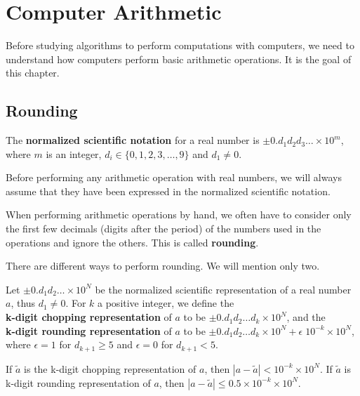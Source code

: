 \chapter{Computer Arithmetic}\label{chaptArith}

Before studying algorithms to perform computations with computers, we
need to understand how computers perform basic arithmetic operations.
It is the goal of this chapter.

\section{Rounding}

\begin{defn}
The {\bfseries normalized scientific notation} for a real number is
$\pm 0.d_1d_2d_3\ldots \times 10^m$, where $m$ is an
integer, $d_i \in \{0,1,2,3,\ldots,9\}$ and $d_1 \neq 0$.
\end{defn}

Before performing any arithmetic operation with real numbers, we will
always assume that they have been expressed in the normalized
scientific notation.

When performing arithmetic operations by hand, we often have to
consider only the first few decimals (digits after the period) of the
numbers used in the operations and ignore the others.  This is called
{\bfseries rounding}.

There are different ways to perform rounding.  We will mention only
two.

\begin{defn}
Let $\pm 0.d_1 d_2 \dots \times 10^N$ be the normalized scientific
representation of a real number $a$, thus $d_1 \neq 0$.  For $k$ a
positive integer, we define the\\
{\bfseries k-digit chopping representation} of $a$ to be
$\pm 0.d_1 d_2 \dots d_k \times 10^N$, and the\\
{\bfseries k-digit rounding representation} of $a$ to be
$\pm 0.d_1 d_2 \dots d_k \times 10^N + \epsilon \; 10^{-k} \times 10^N$,
where $\epsilon = 1$ for $d_{k+1}\geq 5$ and $\epsilon = 0$ for
$d_{k+1} < 5$.
\end{defn}

If $\tilde{a}$ is the k-digit chopping representation of $a$, then
$|a-\tilde{a}| < 10^{-k}\times 10^N$.  If $\tilde{a}$ is 
k-digit rounding representation of $a$, then
$|a-\tilde{a}| \leq 0.5 \times 10^{-k}\times 10^N$.

